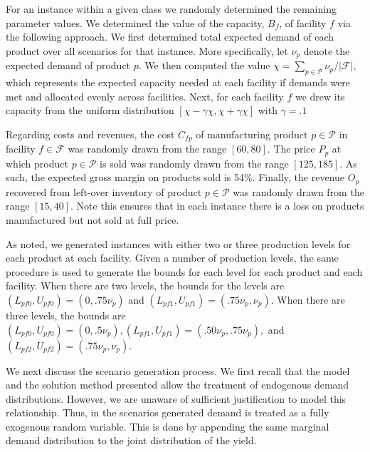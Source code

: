 \documentclass[12pt]{article}
\theoremstyle{thmstylethree}%
\begin{document}
For an instance within a given class we randomly determined the remaining parameter values. We determined the value of the capacity, $B_{f}$, of facility $f$ via the following approach. We first determined total expected demand of each product over all scenarios for that instance. More specifically, let $\nu_{p}$ denote the expected demand of product $p.$ We then computed the value $\chi = \sum_{p \in \mathcal{P}} \nu_{p} / \vert \mathcal{F} \vert,$ which represents the expected capacity needed at each facility if demands were met and allocated evenly across facilities. Next, for each facility $f$ we drew its capacity from the uniform distribution $[\chi - \gamma\chi, \chi + \gamma\chi]$ with $\gamma = .1$

Regarding costs and revenues, the cost $C_{fp}$ of manufacturing product $p \in \mathcal{P}$ in facility $f \in \mathcal{F}$ was randomly drawn from the range $[60,80].$ The price $P_{p}$ at which product $p \in \mathcal{P}$ is sold was randomly drawn from the range $[125,185]$. As such, the expected gross margin on products sold is 54\%.  Finally, the revenue $O_{p}$ recovered from left-over inventory of product $p \in \mathcal{P}$ was randomly drawn from the range $[15,40].$ Note this ensures that in each instance there is a loss on products manufactured but not sold at full price.


As noted, we generated instances with either two or three production levels for each product at each facility. Given a number of production levels, the same procedure is used to generate the bounds for each level for each product and each facility. When there are two levels, the bounds for the levels are $(L_{pf0},U_{pf0}) = (0,.75\nu_{p})$ and $(L_{pf1},U_{pf1}) = (.75\nu_{p},\nu_{p}).$  When there are three levels, the bounds are $(L_{pf0},U_{pf0}) = (0,.5\nu_{p}), (L_{pf1},U_{pf1}) = (.50\nu_{p},.75\nu_{p}), $ and $(L_{pf2},U_{pf2}) = (.75\nu_{p},\nu_{p})$.

We next discuss the scenario generation process. We first recall that the model and the solution method presented allow the treatment of endogenous demand distributions. However, we are unaware of sufficient justification to model this relationship. Thus, in the scenarios generated demand is treated as a fully exogenous random variable. This is done by appending the same marginal demand distribution to the joint distribution of the yield.
\end{document}
